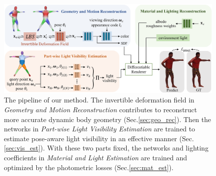\begin{figure}[t]
\begin{center}
   \includegraphics[width=0.95\linewidth]{./fig/pipeline.png}
\end{center}
\caption{The pipeline of our method. The invertible deformation field in \textit{Geometry and Motion Reconstruction} contributes to reconstruct more accurate dynamic body geometry (Sec.\ref{sec:geo_rec}). Then the networks in \textit{Part-wise Light Visibility Estimation} are trained to estimate pose-aware light visibility in an effective manner (Sec.\ref{sec:vis_est}). With these two parts fixed, the networks and lighting coefficients in \textit{Material and Light Estimation} are trained and optimized by the photometric losses (Sec.\ref{sec:mat_est}).}
\label{fig:pipeline}
\end{figure}
